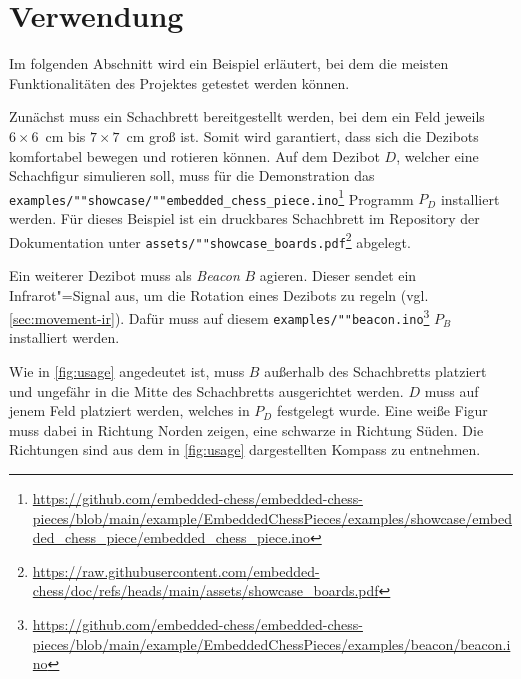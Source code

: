 
\section{Verwendung}

Im folgenden Abschnitt wird ein Beispiel erläutert, bei dem die meisten Funktionalitäten des Projektes getestet werden können.

Zunächst muss ein Schachbrett bereitgestellt werden, bei dem ein Feld jeweils \mbox{$6\times6$~cm} bis \mbox{$7\times7$~cm} groß ist. Somit wird garantiert, dass sich die Dezibots komfortabel bewegen und rotieren können. Auf dem Dezibot $D$, welcher eine Schachfigur simulieren soll, muss für die Demonstration das \texttt{examples/""showcase/""embedded\_\allowbreak chess\_\allowbreak piece.ino}\footnote{\url{https://github.com/embedded-chess/embedded-chess-pieces/blob/main/example/EmbeddedChessPieces/examples/showcase/embedded_chess_piece/embedded_chess_piece.ino}} Programm $P_D$ installiert werden. Für dieses Beispiel ist ein druckbares Schachbrett im Repository der Dokumentation unter \texttt{assets/""showcase\_\allowbreak boards.pdf}\footnote{\url{https://raw.githubusercontent.com/embedded-chess/doc/refs/heads/main/assets/showcase_boards.pdf}} abgelegt.

Ein weiterer Dezibot muss als \emph{Beacon} $B$ agieren. Dieser sendet ein Infrarot"=Signal aus, um die Rotation eines Dezibots zu regeln (vgl. \autoref{sec:movement-ir}). Dafür muss auf diesem \texttt{examples/""beacon.ino}\footnote{\url{https://github.com/embedded-chess/embedded-chess-pieces/blob/main/example/EmbeddedChessPieces/examples/beacon/beacon.ino}} $P_B$ installiert werden.

Wie in \autoref{fig:usage} angedeutet ist, muss $B$ außerhalb des Schachbretts platziert und ungefähr in die Mitte des Schachbretts ausgerichtet werden. $D$ muss auf jenem Feld platziert werden, welches in $P_D$ festgelegt wurde. Eine weiße Figur muss dabei in Richtung Norden zeigen, eine schwarze in Richtung Süden. Die Richtungen sind aus dem in \autoref{fig:usage} dargestellten Kompass zu entnehmen.

